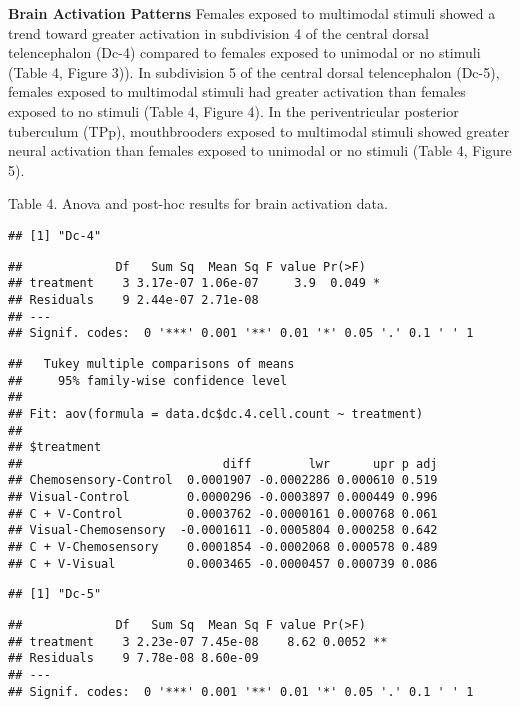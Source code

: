 \documentclass[
  12pt,
]{article}
\begin{document}
\textbf{Brain Activation Patterns}
Females exposed to multimodal stimuli showed a trend toward greater activation in subdivision 4 of the central dorsal telencephalon (Dc-4) compared to females exposed to unimodal or no stimuli (Table 4, Figure 3)). In subdivision 5 of the central dorsal telencephalon (Dc-5), females exposed to multimodal stimuli had greater activation than females exposed to no stimuli (Table 4, Figure 4). In the periventricular posterior tuberculum (TPp), mouthbrooders exposed to multimodal stimuli showed greater neural activation than females exposed to unimodal or no stimuli (Table 4, Figure 5).

Table 4. Anova and post-hoc results for brain activation data.

\begin{verbatim}
## [1] "Dc-4"
\end{verbatim}

\begin{verbatim}
##             Df   Sum Sq  Mean Sq F value Pr(>F)  
## treatment    3 3.17e-07 1.06e-07     3.9  0.049 *
## Residuals    9 2.44e-07 2.71e-08                 
## ---
## Signif. codes:  0 '***' 0.001 '**' 0.01 '*' 0.05 '.' 0.1 ' ' 1
\end{verbatim}

\begin{verbatim}
##   Tukey multiple comparisons of means
##     95% family-wise confidence level
## 
## Fit: aov(formula = data.dc$dc.4.cell.count ~ treatment)
## 
## $treatment
##                            diff        lwr      upr p adj
## Chemosensory-Control  0.0001907 -0.0002286 0.000610 0.519
## Visual-Control        0.0000296 -0.0003897 0.000449 0.996
## C + V-Control         0.0003762 -0.0000161 0.000768 0.061
## Visual-Chemosensory  -0.0001611 -0.0005804 0.000258 0.642
## C + V-Chemosensory    0.0001854 -0.0002068 0.000578 0.489
## C + V-Visual          0.0003465 -0.0000457 0.000739 0.086
\end{verbatim}

\begin{verbatim}
## [1] "Dc-5"
\end{verbatim}

\begin{verbatim}
##             Df   Sum Sq  Mean Sq F value Pr(>F)   
## treatment    3 2.23e-07 7.45e-08    8.62 0.0052 **
## Residuals    9 7.78e-08 8.60e-09                  
## ---
## Signif. codes:  0 '***' 0.001 '**' 0.01 '*' 0.05 '.' 0.1 ' ' 1
\end{verbatim}
\end{document}
